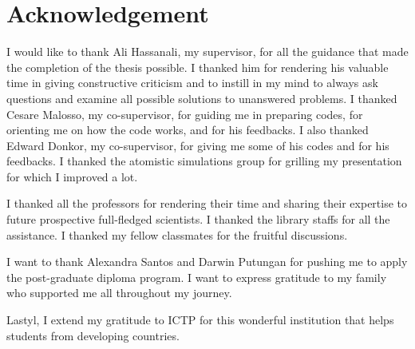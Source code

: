 \chapter*{Acknowledgement}

I would like to thank Ali Hassanali, my supervisor, for all the guidance that made the completion of the thesis possible. I thanked him for rendering his valuable time in giving constructive criticism and to instill in my mind to always ask questions and examine all possible solutions to unanswered problems. I thanked Cesare Malosso, my co-supervisor, for guiding me in preparing codes, for orienting me on how the code works, and for his feedbacks. I also thanked Edward Donkor, my co-supervisor, for giving me some of his codes and for his  feedbacks. I thanked the atomistic simulations group for grilling my presentation for which I improved a lot.

I thanked all the professors for rendering their time and sharing their expertise to future prospective full-fledged scientists. I  thanked the library staffs for all the assistance. I thanked my fellow classmates for the fruitful discussions.

I want to thank Alexandra Santos and Darwin Putungan for pushing me to apply the post-graduate diploma program. I want to express  gratitude to my family who supported me all throughout my journey.

Lastyl, I extend my gratitude  to ICTP for this wonderful institution that helps students from developing countries.
